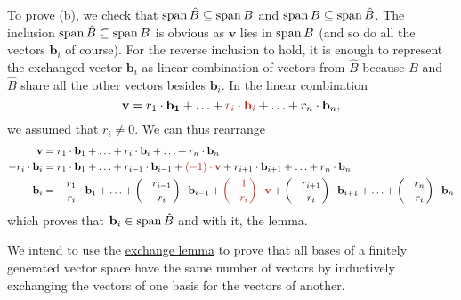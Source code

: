 \begin{lemproof}
 To prove (b), we check that $\operatorname{span} \hat{B} \subseteq \operatorname{span} B$ and $\operatorname{span} B
 \subseteq \operatorname{span} \hat{B}$. The inclusion $\operatorname{span} \hat{B} \subseteq \operatorname{span} B$ is
 obvious as $\mathbf{v}$ lies in $\operatorname{span} B$ (and so do all the vectors
 $\mathbf{b}_i$ of course). For the reverse inclusion to hold, it is enough to
 represent the exchanged vector $\mathbf{b}_i$ as linear combination of vectors
 from $\hat{B}$ because $B$ and $\hat{B}$ share all the other vectors besides
 $\mathbf{b}_i$. In the linear combination
 \[
  \mathbf{v} = r_1 \cdot \mathbf{b_1} + \ldots + \clr{r_i \cdot \mathbf{b}_i} +
  \ldots + r_n \cdot \mathbf{b}_n,
 \]
 we assumed that $r_i \neq 0$. We can thus rearrange
 \begin{align*}
  \mathbf{v} &= r_1 \cdot \mathbf{b}_1 + \ldots + r_i \cdot \mathbf{b}_i +
  \ldots + r_n \cdot \mathbf{b}_n\\
  -r_i \cdot \mathbf{b}_i &= r_1 \cdot \mathbf{b}_1 + \ldots + r_{i-1} \cdot
  \mathbf{b}_{i-1} + \clr{(-1) \cdot \mathbf{v}} + r_{i+1} \cdot
  \mathbf{b}_{i+1} + \ldots + r_n \cdot \mathbf{b}_n\\
  \mathbf{b}_i &= -\frac{r_1}{r_i} \cdot \mathbf{b}_1 + \ldots +
  \left( -\frac{r_{i-1}}{r_i} \right) \cdot \mathbf{b}_{i-1} + \clr{\left(
  -\frac{1}{r_i} \right) \cdot \mathbf{v}} + \left( -\frac{r_{i+1}}{r_i}
 \right) \cdot \mathbf{b}_{i+1} + \ldots + \left( -\frac{r_n}{r_i} \right) \cdot
 \mathbf{b}_n
 \end{align*}
 which proves that $\mathbf{b}_i \in \operatorname{span} \hat{B}$ and with it, the lemma.
\end{lemproof}

We intend to use the \hyperref[lem:exchange-lemma]{exchange lemma} to prove that
all bases of a finitely generated vector space have the same number of vectors
by inductively exchanging the vectors of one basis for the vectors of another.

